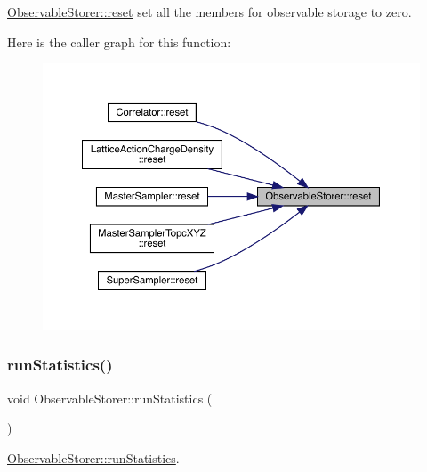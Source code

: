 \mbox{\hyperlink{class_observable_storer_a7b6285a532d796816d75262f91d43dad}{Observable\+Storer\+::reset}} set all the members for observable storage to zero. 

Here is the caller graph for this function\+:
\nopagebreak
\begin{figure}[H]
\begin{center}
\leavevmode
\includegraphics[width=350pt]{class_observable_storer_a7b6285a532d796816d75262f91d43dad_icgraph}
\end{center}
\end{figure}
\mbox{\label{class_observable_storer_a41b3756b423d31c6535d2981ef92d1a1}} 
\subsubsection{\texorpdfstring{runStatistics()}{runStatistics()}}
{\footnotesize\ttfamily void Observable\+Storer\+::run\+Statistics (\begin{DoxyParamCaption}{ }\end{DoxyParamCaption})}



\mbox{\hyperlink{class_observable_storer_a41b3756b423d31c6535d2981ef92d1a1}{Observable\+Storer\+::run\+Statistics}}. 

